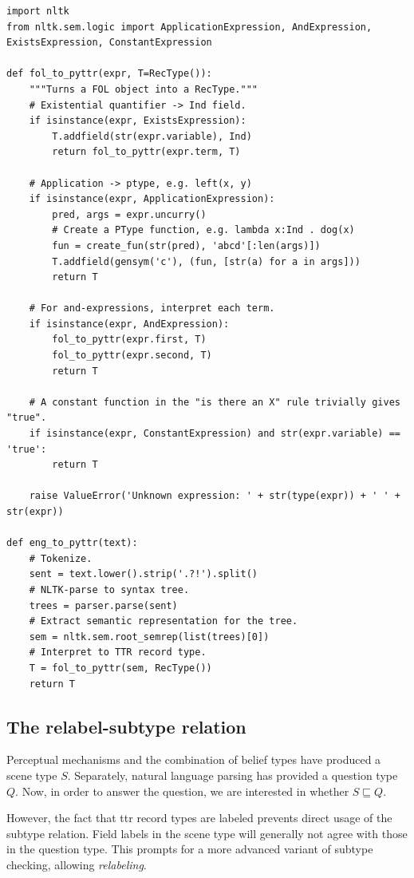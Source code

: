 \begin{lstlisting}[label=lst:foltopyttr, caption=Translation from \gls{fol} to \gls{ttr}.]
import nltk
from nltk.sem.logic import ApplicationExpression, AndExpression, ExistsExpression, ConstantExpression

def fol_to_pyttr(expr, T=RecType()):
    """Turns a FOL object into a RecType."""
    # Existential quantifier -> Ind field.
    if isinstance(expr, ExistsExpression):
        T.addfield(str(expr.variable), Ind)
        return fol_to_pyttr(expr.term, T)
    
    # Application -> ptype, e.g. left(x, y)
    if isinstance(expr, ApplicationExpression):
        pred, args = expr.uncurry()
        # Create a PType function, e.g. lambda x:Ind . dog(x)
        fun = create_fun(str(pred), 'abcd'[:len(args)])
        T.addfield(gensym('c'), (fun, [str(a) for a in args]))
        return T
    
    # For and-expressions, interpret each term.
    if isinstance(expr, AndExpression):
        fol_to_pyttr(expr.first, T)
        fol_to_pyttr(expr.second, T)
        return T
    
    # A constant function in the "is there an X" rule trivially gives "true".
    if isinstance(expr, ConstantExpression) and str(expr.variable) == 'true':
        return T
    
    raise ValueError('Unknown expression: ' + str(type(expr)) + ' ' + str(expr))

def eng_to_pyttr(text):
    # Tokenize.
    sent = text.lower().strip('.?!').split()
    # NLTK-parse to syntax tree.
    trees = parser.parse(sent)
    # Extract semantic representation for the tree.
    sem = nltk.sem.root_semrep(list(trees)[0])
    # Interpret to TTR record type.
    T = fol_to_pyttr(sem, RecType())
    return T
\end{lstlisting}



\subsection{The relabel-subtype relation}
\label{sec:subtyperelabeling}

Perceptual mechanisms and the combination of belief types have produced a scene type $S$.
Separately, natural language parsing has provided a question type $Q$.
Now, in order to answer the question, we are interested in whether $S \sqsubseteq Q$.

However, the fact that \gls{ttr} record types are labeled prevents direct usage of the subtype relation.
Field labels in the scene type will generally not agree with those in the question type.
This prompts for a more advanced variant of subtype checking, allowing \textit{relabeling}.

